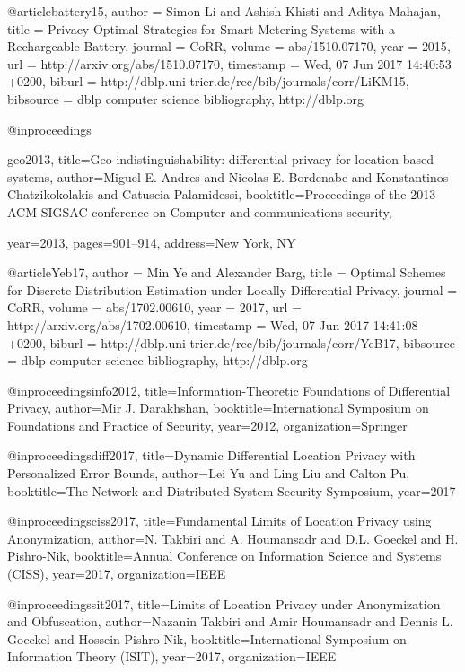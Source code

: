 @article{battery15,
  author    = {Simon Li and
               Ashish Khisti and
               Aditya Mahajan},
  title     = {Privacy-Optimal Strategies for Smart Metering Systems with a Rechargeable
               Battery},
  journal   = {CoRR},
  volume    = {abs/1510.07170},
  year      = {2015},
  url       = {http://arxiv.org/abs/1510.07170},
  timestamp = {Wed, 07 Jun 2017 14:40:53 +0200},
  biburl    = {http://dblp.uni-trier.de/rec/bib/journals/corr/LiKM15},
  bibsource = {dblp computer science bibliography, http://dblp.org}
}



@inproceedings{geo2013,
   title={Geo-indistinguishability: differential privacy for location-based systems},
    author={Miguel E. Andres and Nicolas E. Bordenabe and Konstantinos Chatzikokolakis and Catuscia Palamidessi},
	booktitle={Proceedings of the 2013 ACM SIGSAC conference on Computer and communications security},

   year={2013},
   pages={901--914},
  	address={New York, NY}
   }	

@article{Yeb17,
  author    = {Min Ye and
               Alexander Barg},
  title     = {Optimal Schemes for Discrete Distribution Estimation under Locally
               Differential Privacy},
  journal   = {CoRR},
  volume    = {abs/1702.00610},
  year      = {2017},
  url       = {http://arxiv.org/abs/1702.00610},
  timestamp = {Wed, 07 Jun 2017 14:41:08 +0200},
  biburl    = {http://dblp.uni-trier.de/rec/bib/journals/corr/YeB17},
  bibsource = {dblp computer science bibliography, http://dblp.org}
}

@inproceedings{info2012,
    title={Information-Theoretic Foundations of Differential Privacy},
    author={Mir J. Darakhshan},
    booktitle={International Symposium on Foundations and Practice of Security},
    year={2012},
    organization={Springer}
  }	

@inproceedings{diff2017,
    title={Dynamic Differential Location Privacy with Personalized Error Bounds},
    author={Lei Yu and Ling Liu and Calton Pu},
    booktitle={The Network and Distributed System Security Symposium},
    year={2017}
  }	

@inproceedings{ciss2017,
    title={Fundamental Limits of Location Privacy using Anonymization},
    author={N. Takbiri and A. Houmansadr and D.L. Goeckel and H. Pishro-Nik},
    booktitle={Annual Conference on Information Science and Systems (CISS)},
    year={2017},
    organization={IEEE}
  }	

@inproceedings{sit2017,
    title={Limits of Location Privacy under Anonymization and Obfuscation},
    author={Nazanin Takbiri and Amir Houmansadr and Dennis L. Goeckel and Hossein Pishro-Nik},
    booktitle={International Symposium on Information Theory (ISIT)},
    year={2017},
    organization={IEEE}
  }	



